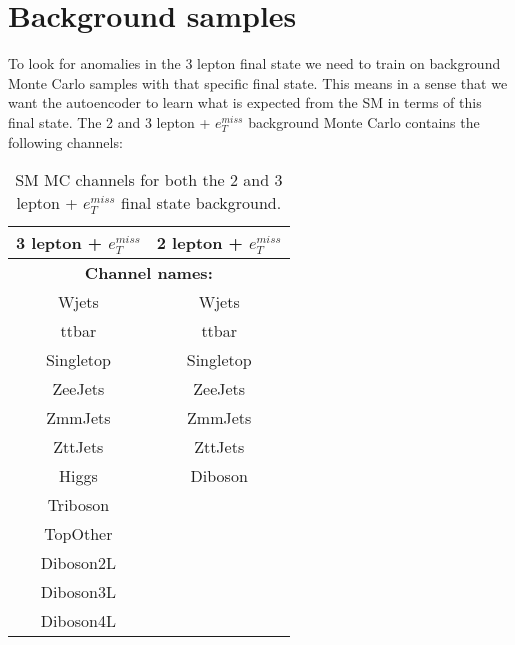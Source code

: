 \section{Background samples}

To look for anomalies in the 3 lepton final state we need to train on background Monte Carlo samples with that specific final state. 
This means in a sense that we want the autoencoder to learn what is expected from the SM in terms of this final state. 
The 2 and 3 lepton + $e_T^{miss}$ background Monte Carlo contains the following channels:

\begin{table}[H]
    \centering
    
    \begin{tabular}{|cc|}
    \hline
    \multicolumn{1}{|c|}{\textbf{3 lepton + $e_T^{miss}$}} & \textbf{2 lepton + $e_T^{miss}$} \\ \hline
    \multicolumn{2}{|c|}{\textbf{Channel names:}}                                             \\ \hline
    \multicolumn{1}{|c|}{Wjets}& Wjets                            \\ \hline
    \multicolumn{1}{|c|}{ttbar}& ttbar                            \\ \hline
    \multicolumn{1}{|c|}{Singletop}& Singletop                        \\ \hline
    \multicolumn{1}{|c|}{ZeeJets}  & ZeeJets                          \\ \hline
    \multicolumn{1}{|c|}{ZmmJets}                          & ZmmJets                          \\ \hline
    \multicolumn{1}{|c|}{ZttJets}                          & ZttJets                          \\ \hline
    \multicolumn{1}{|c|}{Higgs}                            & Diboson                          \\ \hline
    \multicolumn{1}{|c|}{Triboson}                         &                                  \\ \hline
    \multicolumn{1}{|c|}{TopOther}                         &                                  \\ \hline
    \multicolumn{1}{|c|}{Diboson2L}                        &                                  \\ \hline
    \multicolumn{1}{|c|}{Diboson3L}                        &                                  \\ \hline
    \multicolumn{1}{|c|}{Diboson4L}                        &                                  \\ \hline
\end{tabular}
\caption[SM MC channels]{SM MC channels for both the 2 and 3 lepton + $e_T^{miss}$ final state background. }
\label{tab:bkg_channels}
\end{table}


